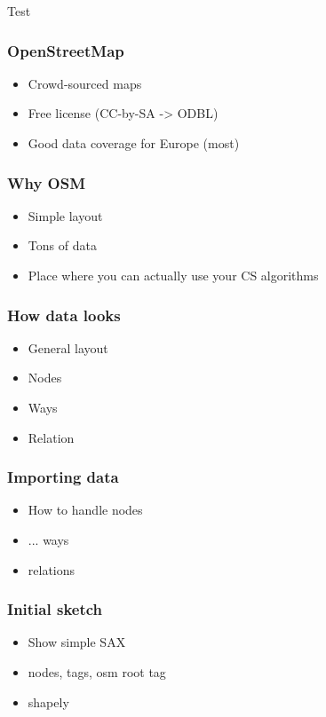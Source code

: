 \documentclass{beamer}
\begin{document}
\begin{frame}{Test}
  \begin{center}
    
  \end{center}
\end{frame}


\begin{frame}
  \frametitle{OpenStreetMap}
  \begin{itemize}
  \item Crowd-sourced maps
  \item Free license (CC-by-SA -> ODBL)
  \item Good data coverage for Europe (most)
  \end{itemize}
\end{frame}

\begin{frame}
  \frametitle{Why OSM}
  \begin{itemize}
  \item Simple layout
  \item Tons of data
  \item Place where you can actually use your CS algorithms
  \end{itemize}
\end{frame}


\begin{frame}
  \frametitle{How data looks}
  \begin{itemize}
  \item General layout
  \item Nodes
  \item Ways
  \item Relation
  \end{itemize}
\end{frame}

\begin{frame}
  \frametitle{Importing data}
  \begin{itemize}
  \item How to handle nodes
  \item ... ways
  \item relations
  \end{itemize}
\end{frame}

\begin{frame}
  \frametitle{Initial sketch}
  \begin{itemize}
  \item Show simple SAX
  \item nodes, tags, osm root tag
  \item shapely
  \end{itemize}
\end{frame}
\end{document}
